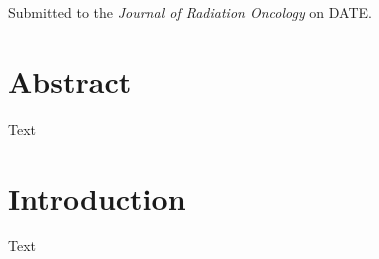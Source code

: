 \noindent Submitted to the \textit{Journal of Radiation Oncology} on DATE.

\section*{Abstract}
Text

\section{Introduction}
Text